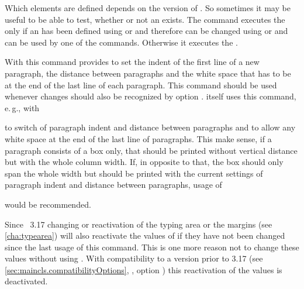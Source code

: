 \begin{Declaration}
\end{Declaration}
%
Which elements are defined depends on the
version of \KOMAScript. So sometimes it may be useful to be able to test,
whether or not an  exists. The command executes the  only if an  has been defined using 
or  and therefore can be changed using
 or  and can be used by one of the
 commands. Otherwise it executes the .%
%


\begin{Declaration}
\end{Declaration}
%
With this command \KOMAScript{} provides to set the indent of the first line
of a new paragraph, the distance between paragraphs and the white space that
has to be at the end of the last line of each paragraph. This command should
be used whenever changes should also be recognized by option
. \KOMAScript{} itself uses
this command, e.\,g., with
\begin{lstcode}[belowskip=\dp\strutbox plus 1ex]
\end{lstcode}
to switch of paragraph indent and distance between paragraphs and to allow any
white space at the end of the last line of paragraphs. This make sense, if a
paragraph consists of a box only, that should be printed without vertical
distance but with the whole column width. If, in opposite to that, the box
should only span the whole width but should be printed with the current
settings of paragraph indent and distance between paragraphs, usage of
\begin{lstcode}[belowskip=\dp\strutbox plus 1ex]
  \setlength{\parfillskip}{0pt plus 1fil}
\end{lstcode}
would be recommended.

Since \KOMAScript~3.17 changing or
reactivation of the typing area or the margins (see
\autoref{cha:typearea}) will also reactivate the values of 
if they have not been changed since the last usage of this command. This is
one more reason not to change these values without using \KOMAScript. With
compatibility to a \KOMAScript{} version prior to 3.17 (see
\autoref{sec:maincls.compatibilityOptions},
, option
)
this reactivation of the  values is deactivated.%
%
%


